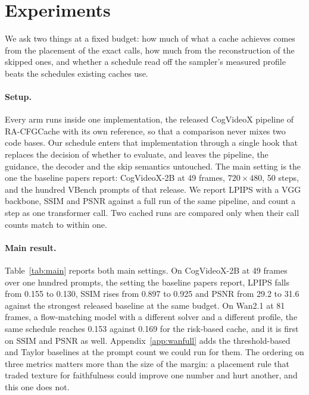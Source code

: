 \section{Experiments}
\label{sec:experiments}
We ask two things at a fixed budget: how much of what a cache achieves comes from the placement of the exact calls, how much from the reconstruction of the skipped ones, and whether a schedule read off the sampler's measured profile beats the schedules existing caches use.

\paragraph{Setup.} Every arm runs inside one implementation, the released CogVideoX pipeline of RA-CFGCache with its own reference, so that a comparison never mixes two code bases. Our schedule enters that implementation through a single hook that replaces the decision of whether to evaluate, and leaves the pipeline, the guidance, the decoder and the skip semantics untouched. The main setting is the one the baseline papers report: CogVideoX-2B at 49 frames, $720\times480$, 50 steps, and the hundred VBench prompts of that release. We report LPIPS with a VGG backbone, SSIM and PSNR against a full run of the same pipeline, and count a step as one transformer call. Two cached runs are compared only when their call counts match to within one.

\paragraph{Main result.} Table~\ref{tab:main} reports both main settings. On CogVideoX-2B at 49 frames over one hundred prompts, the setting the baseline papers report, LPIPS falls from 0.155 to 0.130, SSIM rises from 0.897 to 0.925 and PSNR from 29.2 to 31.6 against the strongest released baseline at the same budget. On Wan2.1 at 81 frames, a flow-matching model with a different solver and a different profile, the same schedule reaches 0.153 against 0.169 for the risk-based cache, and it is first on SSIM and PSNR as well. Appendix~\ref{app:wanfull} adds the threshold-based and Taylor baselines at the prompt count we could run for them. The ordering on three metrics matters more than the size of the margin: a placement rule that traded texture for faithfulness could improve one number and hurt another, and this one does not.

